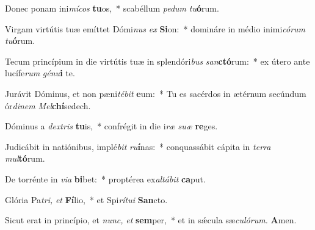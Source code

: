 \item Donec ponam ini\textit{mícos} \textbf{tu}os,~* scabéllum \textit{pedum} \textit{tu}\textbf{ó}rum.
\item Virgam virtútis tuæ emíttet Dómi\textit{nus} \textit{ex} \textbf{Si}on:~* domináre in médio inimi\tinyhspace\textit{córum} \textit{tu}\textbf{ó}rum.
\item Tecum princípium in die virtútis tuæ in splendóri\textit{bus} \textit{san}\textbf{ctó}rum:~* ex útero ante lucífe\textit{rum} \textit{génu}\textbf{i} te.
\item Jurávit Dóminus, et non pæni\tinyhspace\textit{tébit} \textbf{e}um:~* Tu es sacérdos in ætérnum secúndum ór\textit{dinem} \textit{Mel}\textbf{chí}sedech.
\item Dóminus a \textit{dextris} \textbf{tu}is,~* confrégit in die i\tinyhspace\textit{ræ} \textit{suæ} \textbf{re}ges.
\item Judicábit in natiónibus, implé\textit{bit} \textit{ru}\textbf{í}nas:~* conquassábit cápita in \textit{terra} \textit{mul}\textbf{tó}rum.
\item De torrénte in \textit{via} \textbf{bi}bet:~* proptérea ex\tinyhspace\textit{altábit} \textbf{ca}put.
\item Glória Pa\tinyhspace\textit{tri,} \textit{et} \textbf{Fí}lio,~* et Spi\tinyhspace\textit{rítui} \textbf{San}cto.
\item Sicut erat in princípio, et \textit{nunc,} \textit{et} \textbf{sem}per,~* et in sǽcula sæ\tinyhspace\textit{culórum.} \textbf{A}men.